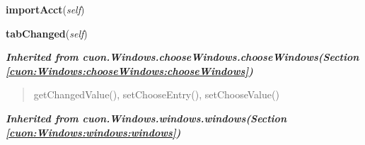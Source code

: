     \label{cuon:PrefsFinance:prefsFinance:prefsFinancewindow:importAcct}

    \vspace{0.5ex}

\hspace{.8\funcindent}\begin{boxedminipage}{\funcwidth}

    \raggedright \textbf{importAcct}(\textit{self})

\setlength{\parskip}{2ex}
\setlength{\parskip}{1ex}
    \end{boxedminipage}

    \label{cuon:PrefsFinance:prefsFinance:prefsFinancewindow:tabChanged}

    \vspace{0.5ex}

\hspace{.8\funcindent}\begin{boxedminipage}{\funcwidth}

    \raggedright \textbf{tabChanged}(\textit{self})

\setlength{\parskip}{2ex}
\setlength{\parskip}{1ex}
    \end{boxedminipage}


\large{\textbf{\textit{Inherited from cuon.Windows.chooseWindows.chooseWindows\textit{(Section \ref{cuon:Windows:chooseWindows:chooseWindows})}}}}

\begin{quote}
getChangedValue(), setChooseEntry(), setChooseValue()
\end{quote}

\large{\textbf{\textit{Inherited from cuon.Windows.windows.windows\textit{(Section \ref{cuon:Windows:windows:windows})}}}}


